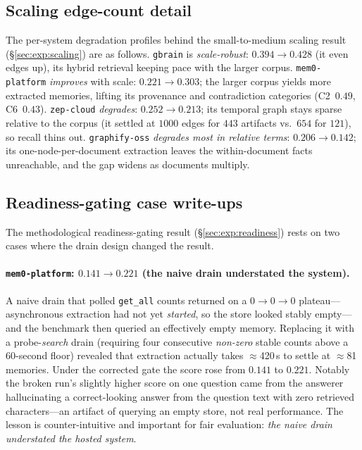 \subsection{Scaling edge-count detail}
\label{app:extended:scaling}

The per-system degradation profiles behind the small-to-medium scaling result
(\S\ref{sec:exp:scaling}) are as follows. \texttt{gbrain} is \emph{scale-robust}:
$0.394 \rightarrow 0.428$ (it even edges up), its hybrid retrieval keeping pace
with the larger corpus. \texttt{mem0-platform} \emph{improves} with scale:
$0.221 \rightarrow 0.303$; the larger corpus yields more extracted memories,
lifting its provenance and contradiction categories (C2~$0.49$, C6~$0.43$).
\texttt{zep-cloud} \emph{degrades}: $0.252 \rightarrow 0.213$; its temporal graph
stays sparse relative to the corpus (it settled at $1000$ edges for $443$
artifacts vs.\ $654$ for $121$), so recall thins out. \texttt{graphify-oss}
\emph{degrades most in relative terms}: $0.206 \rightarrow 0.142$; its
one-node-per-document extraction leaves the within-document facts unreachable,
and the gap widens as documents multiply.

\subsection{Readiness-gating case write-ups}
\label{app:extended:readiness}

The methodological readiness-gating result (\S\ref{sec:exp:readiness}) rests on
two cases where the drain design changed the result.

\paragraph{\texttt{mem0-platform}: $0.141 \rightarrow 0.221$ (the naive drain
understated the system).}
A naive drain that polled \texttt{get\_all} counts returned on a $0\rightarrow
0\rightarrow 0$ plateau---asynchronous extraction had not yet \emph{started}, so
the store looked stably empty---and the benchmark then queried an effectively
empty memory. Replacing it with a probe-\emph{search} drain (requiring four
consecutive \emph{non-zero} stable counts above a 60-second floor) revealed that
extraction actually takes $\approx$420\,s to settle at $\approx$81 memories.
Under the corrected gate the score rose from $0.141$ to $0.221$. Notably the
broken run's slightly higher score on one question came from the answerer
hallucinating a correct-looking answer from the question text with zero
retrieved characters---an artifact of querying an empty store, not real
performance. The lesson is counter-intuitive and important for fair evaluation:
\emph{the naive drain understated the hosted system}.

